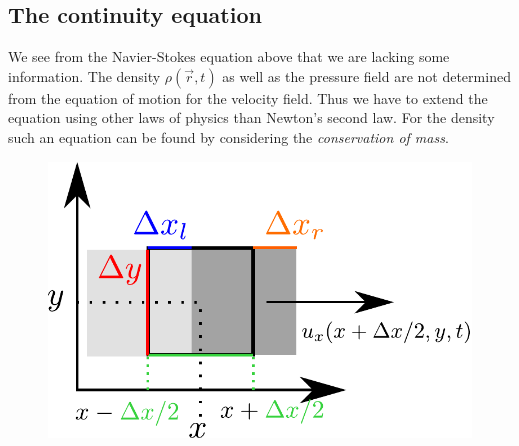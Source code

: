 \documentclass[10pt,a4paper]{article}
\begin{document}
\subsection{The continuity equation}


We see from the Navier-Stokes equation above that we are lacking some information.
%
The density $\rho(\vec{r}, t)$ as well as the pressure field are not determined from the equation of motion for the velocity field.
%
Thus we have to extend the equation using other laws of physics than Newton's second law.
%
For the density such an equation can be found by considering the \textit{conservation of mass}.
%
\begin{figure}[H]
\begin{center}
\includegraphics[scale=0.7]{continuity.pdf}
\end{center}
\end{figure}
\end{document}
